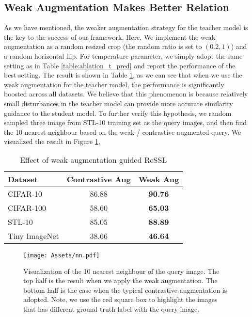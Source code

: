 \documentclass{article}
\newcommand{\<}{\left\langle}
\renewcommand{\>}{\right\rangle}
\begin{document}
\subsection{Weak Augmentation Makes Better Relation}
As we have mentioned, the weaker augmentation strategy for the teacher model is the key to the success of our framework. Here, We implement the weak augmentation as a random resized crop (the random ratio is set to $(0.2, 1)$) and a random horizontal flip.  For temperature parameter, we simply adopt the same setting as in Table \ref{table:ablation_t_pred} and report the performance of the best setting. The result is shown in Table \ref{table:ablation_weakaug}, as we can see that when we use the weak augmentation for the teacher model, the performance is significantly boosted across all datasets. We believe that this phenomenon is because relatively small disturbances in the teacher model can provide more accurate similarity guidance to the student model. To further verify this hypothesis, we random sampled three image from STL-10 training set as the query images, and then find the 10 nearest neighbour based on the weak / contrastive augmented query. We visualized the result in Figure \ref{fig:nn}, 








\renewcommand\arraystretch{1.0}
\begin{table}[h]
 \centering
 \caption{Effect of weak augmentation guided ReSSL }
 \vspace{-10pt}
 \label{table:ablation_weakaug}
\begin{tabular}{l c c } 
\toprule 
Dataset & Contrastive Aug & Weak Aug  \\ \hline
CIFAR-10 & 86.88 & \textbf{90.76}   \\ \hline
CIFAR-100 & 58.60 & \textbf{65.03}   \\ \hline
STL-10 & 85.05 & \textbf{88.89}   \\ \hline
Tiny ImageNet & 38.66 & \textbf{46.64}   \\
\bottomrule 
\end{tabular}
\vspace{-10pt}
\end{table}



\begin{figure}
    \centering
    \texttt{[image: Assets/nn.pdf]}
    \vspace{-20pt}
    \caption{Visualization of the 10 nearest neighbour of the query image. The top half is the result when we apply the weak augmentation. The bottom half is the case when the typical contrastive augmentation is adopted. Note, we use the red square box to highlight the images that has different ground truth label with the query image.}
    \label{fig:nn}
    \vspace{-12pt}
\end{figure}
\end{document}
